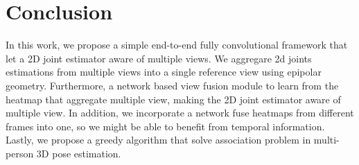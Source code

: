 
\chapter{Conclusion}\label{chapter:introduction}
In this work, we propose a simple end-to-end fully convolutional framework that let a 2D joint estimator aware of multiple views. We aggregare 2d joints estimations from multiple views into a single reference view using epipolar geometry. Furthermore, a network based view fusion module to learn from the heatmap that aggregate multiple view, making the 2D joint estimator aware of multiple view. In addition, we incorporate a network fuse heatmaps from different frames into one, so we might be able to benefit from temporal information. Lastly, we propose a greedy algorithm that solve association problem in multi-person 3D pose estimation.